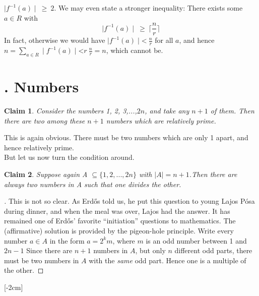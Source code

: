 \documentclass[10pt,twoside]{book}
\newcommand{\Font}[1]{\fontfamily{qhv}\selectfont #1}
\newtheorem*{claim}{Claim}
\begin{document}
		$\mid f^{-1}(a)\mid \ \geq \ 2$.
		 We may even state a stronger inequality: There exists some $a \in R$ with
		\begin{equation}
			\mid f^{-1}(a)\mid \ \geq \ \lceil \frac{n}{r}\rceil \tag{1} \label{e1}
		\end{equation}
		In fact, otherwise we would have $\mid f^{-1}(a)\mid $\textless$ \ \frac{n}{r}$ for all $a$, and hence $n = \sum\limits_{a \in R} \mid f^{-1}(a)\mid $\textless$ r\ \frac{n}{r} = n$, which cannot be.
		\section*{\Font{1. Numbers}}
		\begin{claim}
			Consider the numbers 1, 2, 3,...,$2n$, and take any $n+1$ of them. Then there are two among these $n+1$ numbers which are relatively prime.
		\end{claim}
		\noindent This is again obvious. There must be two numbers which are only 1 apart, and hence relatively prime.\\
		But let us now turn the condition around.
		\begin{claim}
			Suppose again A $\subseteq \{1,2,...,2n\}$ with $\mid A\mid = n + 1$.Then there are always two numbers in A such that one divides the other.
		\end{claim}
		\begin{proof}[\unskip\nopunct]
			This is not so clear. As Erd\H{o}s told us, he put this question to young Lajos Pósa during dinner, and when the meal was over, Lajos had the answer. It has remained one of Erd\H{o}s’ favorite “initiation” questions to mathematics. The (affirmative) solution is provided by the pigeon-hole principle. Write every number $a \in A$ in the form $a = 2^{k}m$, where $m$ is an odd number between 1 and $2n-1$ Since there are $n+1$ numbers in $A$, but only $n$ different odd parts, there must be two numbers in $A$ with the \textit{same} odd part. Hence one is a multiple of the other.
		\end{proof}
		[-2cm]
\end{document}
